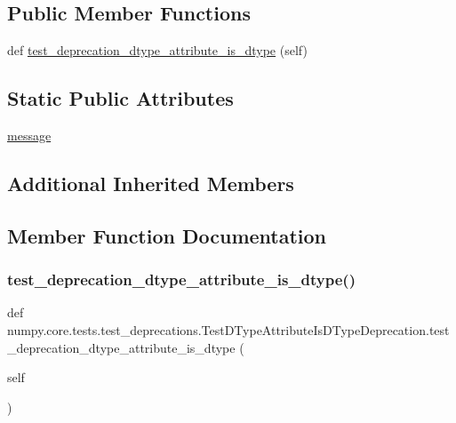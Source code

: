 \subsection*{Public Member Functions}
\begin{DoxyCompactItemize}
\item 
def \hyperlink{classnumpy_1_1core_1_1tests_1_1test__deprecations_1_1TestDTypeAttributeIsDTypeDeprecation_aa1bc91912db213bf881998cd6bc99a54}{test\+\_\+deprecation\+\_\+dtype\+\_\+attribute\+\_\+is\+\_\+dtype} (self)
\end{DoxyCompactItemize}
\subsection*{Static Public Attributes}
\begin{DoxyCompactItemize}
\item 
\hyperlink{classnumpy_1_1core_1_1tests_1_1test__deprecations_1_1TestDTypeAttributeIsDTypeDeprecation_a5fa389a9af389a8b79b613a13568e7fd}{message}
\end{DoxyCompactItemize}
\subsection*{Additional Inherited Members}


\subsection{Member Function Documentation}
\mbox{\label{classnumpy_1_1core_1_1tests_1_1test__deprecations_1_1TestDTypeAttributeIsDTypeDeprecation_aa1bc91912db213bf881998cd6bc99a54}} 
\subsubsection{\texorpdfstring{test\+\_\+deprecation\+\_\+dtype\+\_\+attribute\+\_\+is\+\_\+dtype()}{test\_deprecation\_dtype\_attribute\_is\_dtype()}}
{\footnotesize\ttfamily def numpy.\+core.\+tests.\+test\+\_\+deprecations.\+Test\+D\+Type\+Attribute\+Is\+D\+Type\+Deprecation.\+test\+\_\+deprecation\+\_\+dtype\+\_\+attribute\+\_\+is\+\_\+dtype (\begin{DoxyParamCaption}\item[{}]{self }\end{DoxyParamCaption})}



